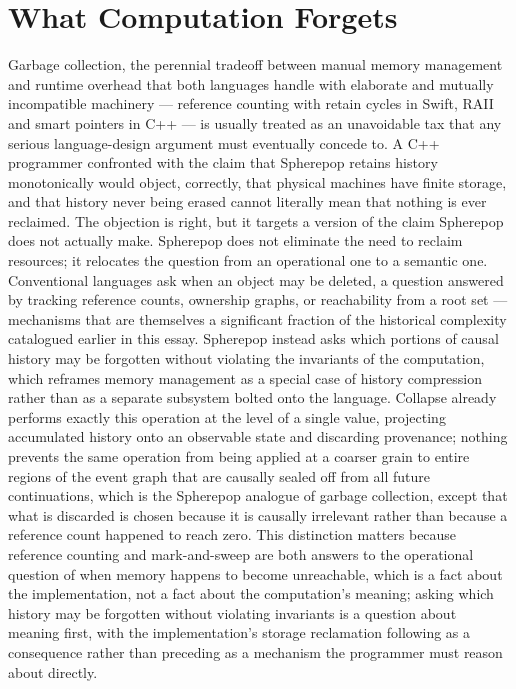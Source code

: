 \documentclass[11pt]{article}
\begin{document}
\section{What Computation Forgets}

Garbage collection, the perennial tradeoff between manual memory management and runtime overhead that both languages handle with elaborate and mutually incompatible machinery --- reference counting with retain cycles in Swift, RAII and smart pointers in C++ --- is usually treated as an unavoidable tax that any serious language-design argument must eventually concede to. A C++ programmer confronted with the claim that Spherepop retains history monotonically would object, correctly, that physical machines have finite storage, and that history never being erased cannot literally mean that nothing is ever reclaimed. The objection is right, but it targets a version of the claim Spherepop does not actually make. Spherepop does not eliminate the need to reclaim resources; it relocates the question from an operational one to a semantic one. Conventional languages ask when an object may be deleted, a question answered by tracking reference counts, ownership graphs, or reachability from a root set --- mechanisms that are themselves a significant fraction of the historical complexity catalogued earlier in this essay. Spherepop instead asks which portions of causal history may be forgotten without violating the invariants of the computation, which reframes memory management as a special case of history compression rather than as a separate subsystem bolted onto the language. Collapse already performs exactly this operation at the level of a single value, projecting accumulated history onto an observable state and discarding provenance; nothing prevents the same operation from being applied at a coarser grain to entire regions of the event graph that are causally sealed off from all future continuations, which is the Spherepop analogue of garbage collection, except that what is discarded is chosen because it is causally irrelevant rather than because a reference count happened to reach zero. This distinction matters because reference counting and mark-and-sweep are both answers to the operational question of when memory happens to become unreachable, which is a fact about the implementation, not a fact about the computation's meaning; asking which history may be forgotten without violating invariants is a question about meaning first, with the implementation's storage reclamation following as a consequence rather than preceding as a mechanism the programmer must reason about directly.
\end{document}
